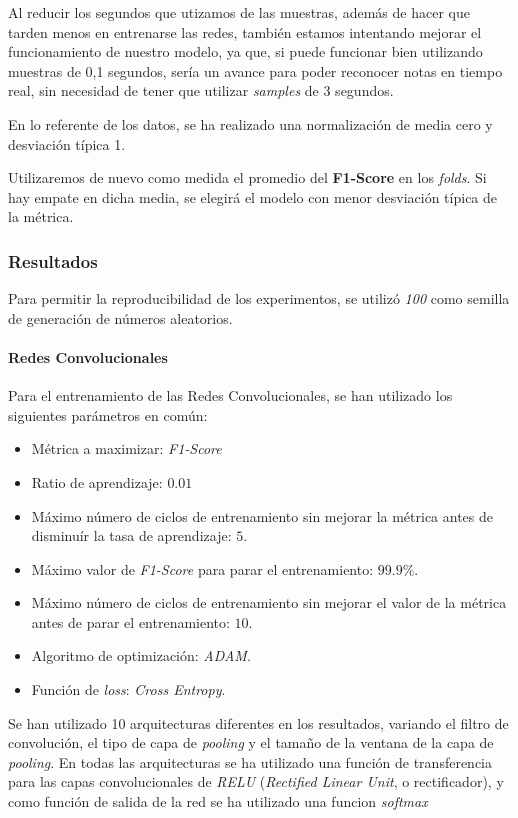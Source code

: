 \documentclass[12pt]{article}
\begin{document}
\bigskip
Al reducir los segundos que utizamos de las muestras, además de hacer que tarden menos en entrenarse las redes,
también estamos intentando mejorar el funcionamiento de nuestro modelo, ya que, si puede funcionar bien
utilizando muestras de 0,1 segundos, sería un avance para poder reconocer notas en tiempo real, sin necesidad
de tener que utilizar \textit{samples} de 3 segundos.

\bigskip
En lo referente de los datos, se ha realizado una normalización de media cero y desviación
típica 1.

\bigskip
Utilizaremos de nuevo como medida el promedio del \textbf{F1-Score} en los \textit{folds}. Si hay empate en dicha media, se elegirá el modelo con menor
desviación típica de la métrica.

\subsubsection{Resultados}
Para permitir la reproducibilidad de los experimentos, se utilizó \textit{100} como semilla de generación de números
aleatorios.

\paragraph{Redes Convolucionales}

Para el entrenamiento de las Redes Convolucionales, se han utilizado los siguientes parámetros en común:
\begin{itemize}
	\item Métrica a maximizar: \textit{F1-Score} 
	\item Ratio de aprendizaje: $0.01$
	\item Máximo número de ciclos de entrenamiento sin mejorar la métrica antes de disminuír la tasa de aprendizaje: $5$.
	\item Máximo valor de \textit{F1-Score} para parar el entrenamiento: $99.9\%$.
	\item Máximo número de ciclos de entrenamiento sin mejorar el valor de la métrica antes de parar el entrenamiento: $10$.
	\item Algoritmo de optimización: \textit{ADAM}.
	\item Función de \textit{loss}: \textit{Cross Entropy}.
\end{itemize}

\bigskip
Se han utilizado 10 arquitecturas diferentes en los resultados, variando el filtro
de convolución, el tipo de capa de \textit{pooling} y el tamaño de la ventana de la capa 
de \textit{pooling}. En todas las arquitecturas se ha utilizado una función de transferencia
para las capas convolucionales de \textit{RELU} (\textit{Rectified Linear Unit}, o rectificador), y
como función de salida de la red se ha utilizado una funcion \textit{softmax}
\end{document}
